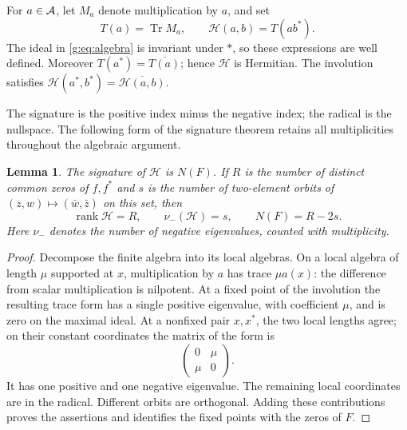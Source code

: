 \documentclass[UTF8,11pt]{ctexart}
\newtheorem{lem}[thm]{Lemma}
\theoremstyle{definition}
\numberwithin{equation}{section}
\newcommand{\HH}{\mathcal H}\newcommand{\Ecal}{\mathcal E}
\DeclareMathOperator{\rank}{rank}\DeclareMathOperator{\tr}{tr}\DeclareMathOperator{\Tr}{Tr}
\begin{document}
For $a\in\mathcal A$, let $M_a$ denote multiplication by $a$, and set
\begin{equation}\label{g:eq:form}
 T(a)=\Tr M_a,\qquad \HH(a,b)=T(ab^*).
\end{equation}
The ideal in \eqref{g:eq:algebra} is invariant under $*$, so these expressions
are well defined. Moreover $T(a^*)=\overline{T(a)}$; hence $\HH$ is Hermitian.
The involution satisfies
$\HH(a^*,b^*)=\overline{\HH(a,b)}$.

The signature is the positive index minus the negative index; the radical
is the nullspace. The following form of the signature theorem retains
all multiplicities throughout the algebraic argument.
\begin{lem}\label{g:lem:signature}
The signature of $\HH$ is $N(F)$. If $R$ is the number of distinct common
zeros of $f,f^*$ and $s$ is the number of two-element orbits of
$(z,w)\mapsto(\bar w,\bar z)$ on this set, then
\[
 \rank\HH=R,\qquad \nu_-(\HH)=s,\qquad
 N(F)=R-2s.
\]
Here $\nu_-$ denotes the number of negative eigenvalues, counted with
multiplicity.
\end{lem}
\begin{proof}
Decompose the finite algebra into its local algebras. On a local algebra
of length $\mu$ supported at $x$, multiplication by $a$ has trace
$\mu a(x)$: the difference from scalar multiplication is nilpotent.
At a fixed point of the involution the resulting trace form has a single
positive eigenvalue, with coefficient $\mu$, and is zero on the maximal
ideal. At a nonfixed pair $x,x^*$, the two local lengths agree; on their
constant coordinates the matrix of the form is
\[
 \begin{pmatrix}0&\mu\\ \mu&0\end{pmatrix}.
\]
It has one positive and one negative eigenvalue. The remaining local
coordinates are in the radical. Different orbits are orthogonal. Adding
these contributions proves the assertions and identifies the fixed
points with the zeros of $F$.
\end{proof}
\end{document}
